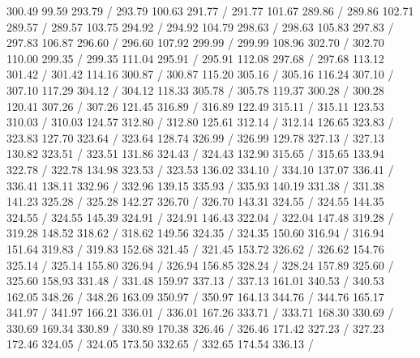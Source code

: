{ 300.49 99.59 293.79 /
 293.79 100.63 291.77 /
 291.77 101.67 289.86 /
 289.86 102.71 289.57 /
 289.57 103.75 294.92 /
 294.92 104.79 298.63 /
 298.63 105.83 297.83 /
 297.83 106.87 296.60 /
 296.60 107.92 299.99 /
 299.99 108.96 302.70 /
 302.70 110.00 299.35 /
 299.35 111.04 295.91 /
 295.91 112.08 297.68 /
 297.68 113.12 301.42 /
 301.42 114.16 300.87 /
 300.87 115.20 305.16 /
 305.16 116.24 307.10 /
 307.10 117.29 304.12 /
 304.12 118.33 305.78 /
 305.78 119.37 300.28 /
 300.28 120.41 307.26 /
 307.26 121.45 316.89 /
 316.89 122.49 315.11 /
 315.11 123.53 310.03 /
 310.03 124.57 312.80 /
 312.80 125.61 312.14 /
 312.14 126.65 323.83 /
 323.83 127.70 323.64 /
 323.64 128.74 326.99 /
 326.99 129.78 327.13 /
 327.13 130.82 323.51 /
 323.51 131.86 324.43 /
 324.43 132.90 315.65 /
 315.65 133.94 322.78 /
 322.78 134.98 323.53 /
 323.53 136.02 334.10 /
 334.10 137.07 336.41 /
 336.41 138.11 332.96 /
 332.96 139.15 335.93 /
 335.93 140.19 331.38 /
 331.38 141.23 325.28 /
 325.28 142.27 326.70 /
 326.70 143.31 324.55 /
 324.55 144.35 324.55 /
 324.55 145.39 324.91 /
 324.91 146.43 322.04 /
 322.04 147.48 319.28 /
 319.28 148.52 318.62 /
 318.62 149.56 324.35 /
 324.35 150.60 316.94 /
 316.94 151.64 319.83 /
 319.83 152.68 321.45 /
 321.45 153.72 326.62 /
 326.62 154.76 325.14 /
 325.14 155.80 326.94 /
 326.94 156.85 328.24 /
 328.24 157.89 325.60 /
 325.60 158.93 331.48 /
 331.48 159.97 337.13 /
 337.13 161.01 340.53 /
 340.53 162.05 348.26 /
 348.26 163.09 350.97 /
 350.97 164.13 344.76 /
 344.76 165.17 341.97 /
 341.97 166.21 336.01 /
 336.01 167.26 333.71 /
 333.71 168.30 330.69 /
 330.69 169.34 330.89 /
 330.89 170.38 326.46 /
 326.46 171.42 327.23 /
 327.23 172.46 324.05 /
 324.05 173.50 332.65 /
 332.65 174.54 336.13 /
}
